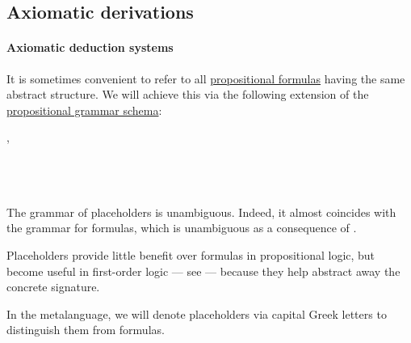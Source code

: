 \subsection{Axiomatic derivations}\label{subsec:axiomatic_derivations}

\paragraph{Axiomatic deduction systems}

\begin{definition}\label{def:propositional_formula_placeholder}\mimprovised
  It is sometimes convenient to refer to all \hyperref[def:propositional_syntax/formula]{propositional formulas} having the same abstract structure. We will achieve this via the following extension of the \hyperref[def:propositional_syntax]{propositional grammar schema}:
  \begin{bnf*}
      {}, \\
             {\bnftsq{\( \syntop \)} \bnfor \bnftsq{\( \synbot \)} \bnfor} \\
     \\
     \\
  \end{bnf*}
\end{definition}
\begin{comments}
  \item The grammar of placeholders is unambiguous. Indeed, it almost coincides with the grammar for formulas, which is unambiguous as a consequence of .
  \item Placeholders provide little benefit over formulas in propositional logic, but become useful in first-order logic --- see  --- because they help abstract away the concrete signature.
  \item In the metalanguage, we will denote placeholders via capital Greek letters to distinguish them from formulas.
\end{comments}


